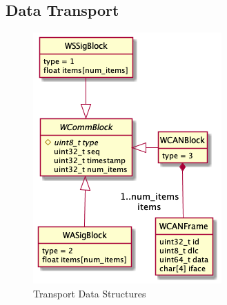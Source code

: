 \documentclass[letterpaper,twocolumn,10pt]{article}
\begin{document}
\subsection{Data Transport}
\begin{figure}[t!]
    \centering
    \includegraphics[width=\linewidth]{out/images/data_structures/data_structures.png}
    \caption{Transport Data Structures}
    \label{fig:ds}
\end{figure}
\end{document}
